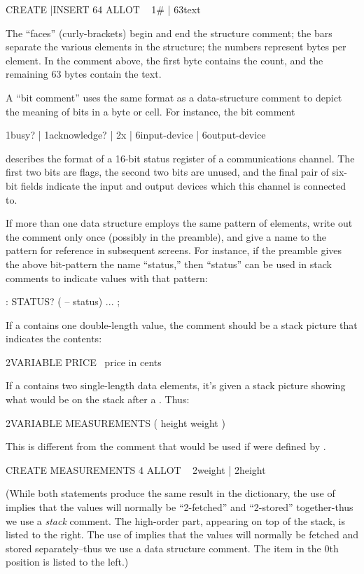 \begin{Code}
CREATE |INSERT  64 ALLOT  \  { 1# | 63text }
\end{Code}
The ``faces'' (curly-brackets) begin and end the structure comment;
the bars separate the various elements in the structure; the numbers
represent bytes per element.  In the comment above, the first byte
contains the count, and the remaining 63 bytes contain the text.

A ``bit comment'' uses the same format as a data-structure comment to
depict the meaning of bits in a byte or cell.  For instance, the bit
comment
\begin{Code}
{ 1busy? | 1acknowledge? | 2x | 6input-device |
   6output-device }
\end{Code}
describes the format of a 16-bit status register of a communications
channel.  The first two bits are flags,
the second two bits are unused, and the final pair of six-bit fields
indicate the input and output devices which this channel is connected
to.

If more than one data structure employs the same pattern of elements,
write out the comment only once (possibly in the preamble), and
give a name to the pattern for reference in subsequent screens.  For
instance, if the preamble gives the above bit-pattern the name
``status,'' then ``status'' can be used in stack comments to indicate
values with that pattern:
\begin{Code}
: STATUS?  ( -- status) ... ;
\end{Code}
If a  contains one double-length value, the comment
should be a stack picture that indicates the contents:
\begin{Code}
2VARIABLE PRICE  \ price in cents
\end{Code}
If a  contains two single-length data elements, it's
given a stack picture showing what would be on the stack after a
. Thus:
\begin{Code}
2VARIABLE MEASUREMENTS  ( height weight )
\end{Code}
This is different from the comment that would be used if
 were defined by .
\begin{Code}
CREATE MEASUREMENTS  4 ALLOT    \ { 2weight | 2height }
\end{Code}
(While both statements produce the same result in the dictionary, the
use of  implies that the values will normally be
``2-fetched'' and ``2-stored'' together-thus we use a \emph{stack}
comment.  The high-order part, appearing on top of the stack, is
listed to the right.  The use of  implies that the
values will normally be fetched and stored separately--thus we use a
data structure comment.  The item in the 0th position is listed to the
left.)

